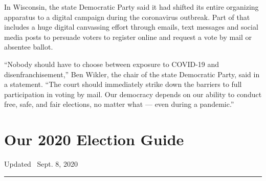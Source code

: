 In Wisconsin, the state Democratic Party said it had shifted its entire
organizing apparatus to a digital campaign during the coronavirus
outbreak. Part of that includes a huge digital canvassing effort through
emails, text messages and social media posts to persuade voters to
register online and request a vote by mail or absentee ballot.

``Nobody should have to choose between exposure to COVID-19 and
disenfranchisement,'' Ben Wikler, the chair of the state Democratic
Party, said in a statement. ``The court should immediately strike down
the barriers to full participation in voting by mail. Our democracy
depends on our ability to conduct free, safe, and fair elections, no
matter what --- even during a pandemic.''

\hypertarget{our-2020-election-guide}{%
\section{Our 2020 Election Guide}\label{our-2020-election-guide}}

Updated ~Sept. 8, 2020

\begin{center}\rule{0.5\linewidth}{\linethickness}\end{center}

